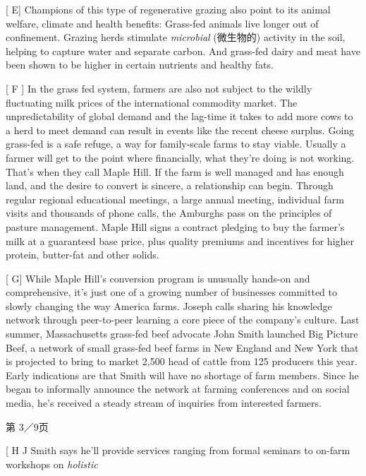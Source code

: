 \documentclass[UTF8,11pt]{ctexart}
\begin{document}
[ E] Champions of this type of regenerative grazing also point to its animal welfare, climate and health benefits: Grass-fed animals live longer out of confinement. Grazing herds stimulate \textit{microbial }(微生物的) activity in the soil, helping to capture water and separate carbon. And grass-fed dairy and meat have been shown to be higher in certain nutrients and healthy fats.


[ F ] In the grass fed system, farmers are also not subject to the wildly fluctuating milk prices of the international commodity market. The unpredictability of global demand and the lag-time it takes to add more cows to a herd to meet demand can result in events like the recent cheese surplus. Going grass-fed is a safe refuge, a way for family-scale farms to stay viable. Usually a farmer will get to the point where financially, what they're doing is not working. That's when they call Maple Hill. If the farm is well managed and has enough land, and the desire to convert is sincere, a relationship can begin. Through regular regional educational meetings, a large annual meeting, individual farm visits and thousands of phone calls, the Amburghs pass on the principles of pasture management. Maple Hill signs a contract pledging to buy the farmer's milk at a guaranteed base price, plus quality premiums and incentives for higher protein, butter-fat and other solids.


[ G] While Maple Hill's conversion program is unusually hands-on and comprehensive, it's just one of a growing number of businesses committed to slowly changing the way America farms. Joseph calls sharing his knowledge network through peer-to-peer learning a core piece of the company's culture. Last summer, Massachusetts grass-fed beef advocate John Smith launched Big Picture Beef, a network of small grass-fed beef farms in New England and New York that is projected to bring to market 2,500 head of cattle from 125 producers this year. Early indications are that Smith will have no shortage of farm members. Since he began to informally announce the network at farming conferences and on social media, he's received a steady stream of inquiries from interested farmers.


第 3／9页


[ H J Smith says he'll provide services ranging from formal seminars to on-farm workshops on \textit{holistic}
\end{document}
